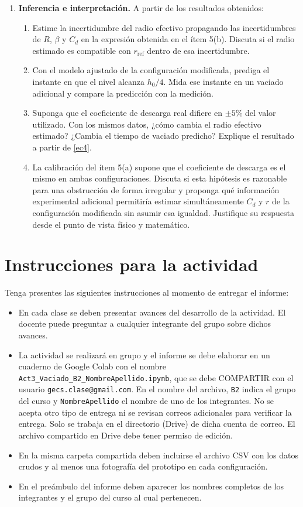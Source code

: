\documentclass[oneside,letter,spanish,activeacute,english,links,10pt]{amcaGCS_EDO}
\begin{document}
\begin{enumerate}
		\item {\bf Inferencia e interpretación.}
		A partir de los resultados obtenidos:
		\begin{enumerate}
			\item Estime la incertidumbre del radio efectivo propagando las incertidumbres de $R$, $\beta$ y $C_d$ en la expresión obtenida en el ítem 5(b). Discuta si el radio estimado es compatible con $r_{\mathrm{ref}}$ dentro de esa incertidumbre.
			\item Con el modelo ajustado de la configuración modificada, prediga el instante en que el nivel alcanza $h_0/4$. Mida ese instante en un vaciado adicional y compare la predicción con la medición.
			\item Suponga que el coeficiente de descarga real difiere en $\pm 5\%$ del valor utilizado. Con los mismos datos, ¿cómo cambia el radio efectivo estimado? ¿Cambia el tiempo de vaciado predicho? Explique el resultado a partir de \eqref{ec4}.
			\item La calibración del ítem 5(a) supone que el coeficiente de descarga es el mismo en ambas configuraciones. Discuta si esta hipótesis es razonable para una obstrucción de forma irregular y proponga qué información experimental adicional permitiría estimar simultáneamente $C_d$ y $r$ de la configuración modificada sin asumir esa igualdad. Justifique su respuesta desde el punto de vista físico y matemático.
		\end{enumerate}
	\end{enumerate}


\section{Instrucciones para la actividad}
Tenga presentes las siguientes instrucciones al momento de entregar el informe:
\begin{itemize}
	\item En cada clase se deben presentar avances del desarrollo de la actividad. El docente puede preguntar a cualquier integrante del grupo sobre dichos avances.
	\item La actividad se realizará en grupo y el informe se debe elaborar en un cuaderno de Google Colab con el nombre
	\verb+Act3_Vaciado_B2_NombreApellido.ipynb+,
	que se debe COMPARTIR con el usuario \verb+gecs.clase@gmail.com+.
	En el nombre del archivo, \verb+B2+ indica el grupo del curso y \verb+NombreApellido+ el nombre de uno de los integrantes. No se acepta otro tipo de entrega ni se revisan correos adicionales para verificar la entrega. Solo se trabaja en el directorio (Drive) de dicha cuenta de correo. El archivo compartido en Drive debe tener permiso de edición.
	\item En la misma carpeta compartida deben incluirse el archivo CSV con los datos crudos y al menos una fotografía del prototipo en cada configuración.
	\item En el preámbulo del informe deben aparecer los nombres completos de los integrantes y el grupo del curso al cual pertenecen.
\end{itemize}
\end{document}

